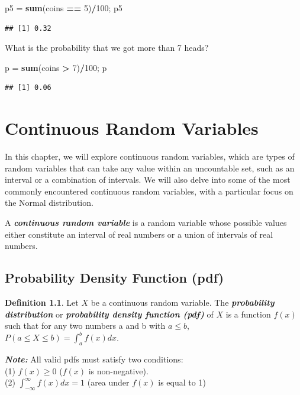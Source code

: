 \documentclass[
  11pt,
  oneside]{book}
\newenvironment{Shaded}{\begin{snugshade}}{\end{snugshade}}
\newcommand{\DecValTok}[1]{\textcolor[rgb]{0.00,0.00,0.81}{#1}}
\newcommand{\FunctionTok}[1]{\textcolor[rgb]{0.13,0.29,0.53}{\textbf{#1}}}
\newcommand{\NormalTok}[1]{#1}
\newcommand{\OtherTok}[1]{\textcolor[rgb]{0.56,0.35,0.01}{#1}}
\newcommand{\SpecialCharTok}[1]{\textcolor[rgb]{0.81,0.36,0.00}{\textbf{#1}}}
\theoremstyle{definition}
\newtheorem{definition}{Definition}[chapter]
\theoremstyle{definition}
\theoremstyle{definition}
\theoremstyle{definition}
\theoremstyle{remark}
\begin{document}
\begin{Shaded}
\begin{Highlighting}[]
\NormalTok{p5 }\OtherTok{=} \FunctionTok{sum}\NormalTok{(coins }\SpecialCharTok{==} \DecValTok{5}\NormalTok{)}\SpecialCharTok{/}\DecValTok{100}\NormalTok{; p5}
\end{Highlighting}
\end{Shaded}

\begin{verbatim}
## [1] 0.32
\end{verbatim}

What is the probability that we got more than 7 heads?

\begin{Shaded}
\begin{Highlighting}[]
\NormalTok{p }\OtherTok{=} \FunctionTok{sum}\NormalTok{(coins }\SpecialCharTok{\textgreater{}} \DecValTok{7}\NormalTok{)}\SpecialCharTok{/}\DecValTok{100}\NormalTok{; p}
\end{Highlighting}
\end{Shaded}

\begin{verbatim}
## [1] 0.06
\end{verbatim}

\chapter{Continuous Random Variables}\label{continuous-random-variables}

In this chapter, we will explore continuous random variables, which are types of random variables that can take any value within an uncountable set, such as an interval or a combination of intervals. We will also delve into some of the most commonly encountered continuous random variables, with a particular focus on the Normal distribution.

A \textbf{\emph{continuous random variable}} is a random variable whose possible values either constitute an interval of real numbers or a union of intervals of real numbers.

\section{Probability Density Function (pdf)}\label{probability-density-function-pdf}

\begin{definition}
Let \(X\) be a continuous random variable. The \textbf{\emph{probability distribution}} or \textbf{\emph{probability density function (pdf)}} of \(X\) is a function \(f(x)\) such that for any two numbers a and b with \(a \le b\), \(P(a \le X \le b) = \int_a^b f(x) dx\).

\textbf{\emph{Note:}} All valid pdfs must satisfy two conditions:\\
(1) \(f(x) \geq 0\) (\(f(x)\) is non-negative).\\
(2) \(\int_{-\infty}^\infty f(x) dx = 1\) (area under \(f(x)\) is equal to 1)
\end{definition}
\end{document}
